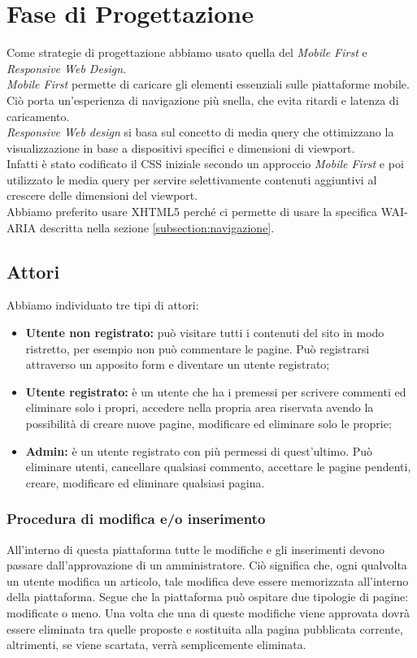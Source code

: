\section{Fase di Progettazione}
Come strategie di progettazione abbiamo usato quella del \textit{Mobile First} e \textit{Responsive Web Design}.\\
\textit{Mobile First} permette di caricare gli elementi essenziali sulle piattaforme mobile. Ciò porta un'esperienza di navigazione più snella, che evita ritardi e latenza di caricamento.\\
\textit{Responsive Web design} si basa sul concetto di media query che ottimizzano la visualizzazione in base a dispositivi specifici e dimensioni di viewport.\\
Infatti è stato codificato il CSS iniziale secondo un approccio \textit{Mobile First} e poi utilizzato le media query per servire selettivamente contenuti aggiuntivi al crescere delle dimensioni del viewport.\\
Abbiamo preferito usare XHTML5 perché ci permette di usare la specifica WAI-ARIA descritta nella sezione \ref{subsection:navigazione}.

\subsection{Attori}
Abbiamo individuato tre tipi di attori:
\begin{itemize}
	\item \textbf{Utente non registrato:} può visitare tutti i contenuti del sito in modo ristretto, per esempio non può commentare le pagine. Può registrarsi attraverso un apposito form e diventare un utente registrato;
	\item \textbf{Utente registrato:} è un utente che ha i premessi per scrivere commenti ed eliminare solo i propri, accedere nella propria area riservata avendo la possibilità di creare nuove pagine, modificare ed eliminare solo le proprie;
	\item \textbf{Admin:} è un utente registrato con più permessi di quest'ultimo. Può eliminare utenti, cancellare qualsiasi commento, accettare le pagine pendenti, creare, modificare ed eliminare qualsiasi pagina.
\end{itemize}

\subsubsection{Procedura di modifica e/o inserimento} \label{subsection:modificainserimento}
All'interno di questa piattaforma tutte le modifiche e gli inserimenti devono passare dall'approvazione di un amministratore. Ciò significa che, ogni qualvolta un utente modifica un articolo, tale modifica deve essere memorizzata all'interno della piattaforma. Segue che la piattaforma può ospitare due tipologie di pagine: modificate o meno. Una volta che una di queste modifiche viene approvata dovrà essere eliminata tra quelle proposte e sostituita alla pagina pubblicata corrente, altrimenti, se viene scartata, verrà semplicemente eliminata.
\pagebreak

